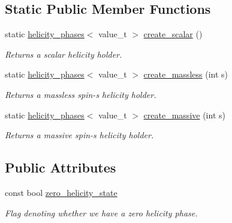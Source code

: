 \subsection*{Static Public Member Functions}
\begin{DoxyCompactItemize}
\item 
\hypertarget{a00275_a3b793e835178f97e46abe614c3511c53}{}static \hyperlink{a00275}{helicity\+\_\+phases}$<$ value\+\_\+t $>$ \hyperlink{a00275_a3b793e835178f97e46abe614c3511c53}{create\+\_\+scalar} ()\label{a00275_a3b793e835178f97e46abe614c3511c53}

\begin{DoxyCompactList}\small\item\em Returns a scalar helicity holder. \end{DoxyCompactList}\item 
\hypertarget{a00275_a4643d48b195159b06a0ca695a9f0ef9a}{}static \hyperlink{a00275}{helicity\+\_\+phases}$<$ value\+\_\+t $>$ \hyperlink{a00275_a4643d48b195159b06a0ca695a9f0ef9a}{create\+\_\+massless} (int s)\label{a00275_a4643d48b195159b06a0ca695a9f0ef9a}

\begin{DoxyCompactList}\small\item\em Returns a massless spin-\/s helicity holder. \end{DoxyCompactList}\item 
\hypertarget{a00275_aa4e25d80ab5d66f829d5150edf058e15}{}static \hyperlink{a00275}{helicity\+\_\+phases}$<$ value\+\_\+t $>$ \hyperlink{a00275_aa4e25d80ab5d66f829d5150edf058e15}{create\+\_\+massive} (int s)\label{a00275_aa4e25d80ab5d66f829d5150edf058e15}

\begin{DoxyCompactList}\small\item\em Returns a massive spin-\/s helicity holder. \end{DoxyCompactList}\end{DoxyCompactItemize}
\subsection*{Public Attributes}
\begin{DoxyCompactItemize}
\item 
\hypertarget{a00275_a9000d212d7d943c73228bcc6ac2ccdce}{}const bool \hyperlink{a00275_a9000d212d7d943c73228bcc6ac2ccdce}{zero\+\_\+helicity\+\_\+state}\label{a00275_a9000d212d7d943c73228bcc6ac2ccdce}

\begin{DoxyCompactList}\small\item\em Flag denoting whether we have a zero helicity phase. \end{DoxyCompactList}\end{DoxyCompactItemize}


